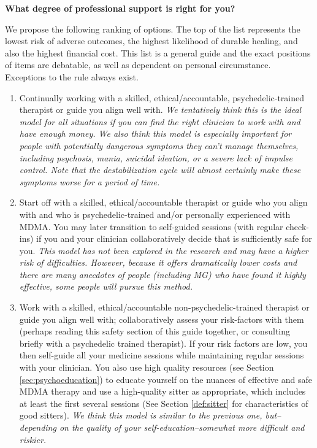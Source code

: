 \documentclass[12pt,letterpaper]{book}
\begin{document}
\noindent \textbf{What degree of professional support is right for you?}

We propose the following ranking of options. The top of the list represents the lowest risk of adverse outcomes, the highest likelihood of durable healing, and also the highest financial cost. This list is a general guide and the exact positions of items are debatable, as well as dependent on personal circumstance. Exceptions to the rule always exist.
\begin{enumerate}
    \item Continually working with a skilled, ethical/accountable, psychedelic-trained therapist or guide you align well with. \textit{We tentatively think this is the ideal model for all situations if you can find the right clinician to work with and have enough money. We also think this model is especially important for people with potentially dangerous symptoms they can't manage themselves, including psychosis, mania, suicidal ideation, or a severe lack of impulse control. Note that the destabilization cycle will almost certainly make these symptoms worse for a period of time.}
    \item Start off with a skilled, ethical/accountable therapist or guide who you align with and who is psychedelic-trained and/or personally experienced with MDMA. You may later transition to self-guided sessions (with regular check-ins) if you and your clinician collaboratively decide that is sufficiently safe for you. \textit{This model has not been explored in the research and may have a higher risk of difficulties. However, because it offers dramatically lower costs and there are many anecdotes of people (including MG) who have found it highly effective, some people will pursue this method.}
    \item  Work with a skilled, ethical/accountable non-psychedelic-trained therapist or guide you align well with; collaboratively assess your risk-factors with them (perhaps reading this safety section of this guide together, or consulting briefly with a psychedelic trained therapist). If your risk factors are low, you then self-guide all your medicine sessions while maintaining regular sessions with your clinician. You also use high quality resources (see Section \ref{sec:psychoeducation}) to educate yourself on the nuances of effective and safe MDMA therapy and use a high-quality sitter as appropriate, which includes at least the first several sessions (See Section \ref{def:sitter} for characteristics of good sitters). \textit{We think this model is similar to the previous one, but--depending on the quality of your self-education--somewhat more difficult and riskier.}

\end{enumerate}
\end{document}
